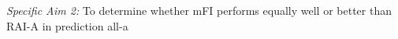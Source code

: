 \emph{Specific Aim 2:} To determine whether mFI performs equally well or better than RAI-A in prediction all-a